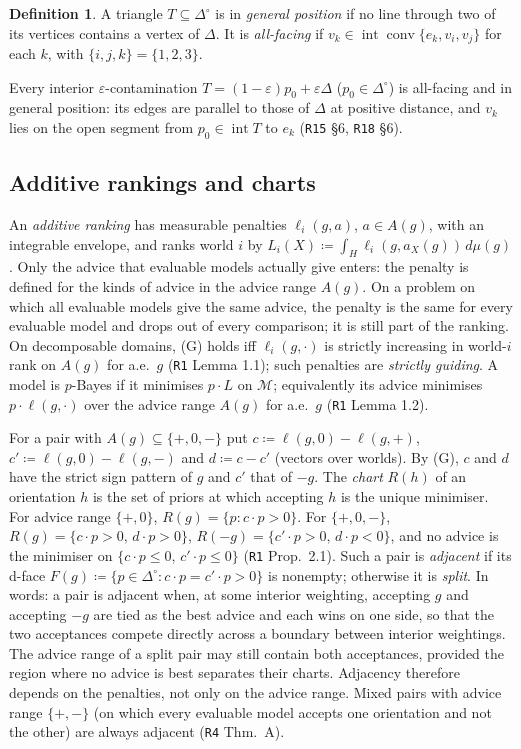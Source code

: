 \documentclass[11pt]{article}
\theoremstyle{definition}
\newtheorem{definition}[theorem]{Definition}
\theoremstyle{remark}
\newcommand{\Di}{\Delta^{\circ}}
\newcommand{\M}{\mathcal M}
\newcommand{\co}{\operatorname{conv}}
\newcommand{\src}[1]{\texttt{#1}}
\begin{document}
\begin{definition}\label{def:allfacing}
A triangle $T\subseteq\Di$ is in \emph{general position} if no line through two of its vertices contains a vertex of $\Delta$. It is \emph{all-facing} if $v_k\in\operatorname{int}\co\{e_k,v_i,v_j\}$ for each $k$, with $\{i,j,k\}=\{1,2,3\}$.
\end{definition}
Every interior $\varepsilon$-contamination $T=(1-\varepsilon)p_0+\varepsilon\Delta$ ($p_0\in\Di$) is all-facing and in general position: its edges are parallel to those of $\Delta$ at positive distance, and $v_k$ lies on the open segment from $p_0\in\operatorname{int}T$ to $e_k$ (\src{R15} \S6, \src{R18} \S6).

\subsection{Additive rankings and charts}
An \emph{additive ranking} has measurable penalties $\ell_i(g,a)$, $a\in A(g)$, with an integrable envelope, and ranks world $i$ by $L_i(X)\coloneqq\int_H\ell_i(g,a_X(g))\,d\mu(g)$. Only the advice that evaluable models actually give enters: the penalty is defined for the kinds of advice in the advice range $A(g)$. On a problem on which all evaluable models give the same advice, the penalty is the same for every evaluable model and drops out of every comparison; it is still part of the ranking. On decomposable domains, (G) holds iff $\ell_i(g,\cdot)$ is strictly increasing in world-$i$ rank on $A(g)$ for a.e.\ $g$ (\src{R1} Lemma 1.1); such penalties are \emph{strictly guiding}. A model is $p$-Bayes if it minimises $p\cdot L$ on $\M$; equivalently its advice minimises $p\cdot\ell(g,\cdot)$ over the advice range $A(g)$ for a.e.\ $g$ (\src{R1} Lemma 1.2).

For a pair with $A(g)\subseteq\{+,0,-\}$ put $c\coloneqq\ell(g,0)-\ell(g,+)$, $c'\coloneqq\ell(g,0)-\ell(g,-)$ and $d\coloneqq c-c'$ (vectors over worlds). By (G), $c$ and $d$ have the strict sign pattern of $g$ and $c'$ that of $-g$. The \emph{chart} $R(h)$ of an orientation $h$ is the set of priors at which accepting $h$ is the unique minimiser. For advice range $\{+,0\}$, $R(g)=\{p:c\cdot p>0\}$. For $\{+,0,-\}$, $R(g)=\{c\cdot p>0,\,d\cdot p>0\}$, $R(-g)=\{c'\cdot p>0,\,d\cdot p<0\}$, and no advice is the minimiser on $\{c\cdot p\le0,\,c'\cdot p\le0\}$ (\src{R1} Prop.~2.1). Such a pair is \emph{adjacent} if its d-face $F(g)\coloneqq\{p\in\Di:c\cdot p=c'\cdot p>0\}$ is nonempty; otherwise it is \emph{split}. In words: a pair is adjacent when, at some interior weighting, accepting $g$ and accepting $-g$ are tied as the best advice and each wins on one side, so that the two acceptances compete directly across a boundary between interior weightings. The advice range of a split pair may still contain both acceptances, provided the region where no advice is best separates their charts. Adjacency therefore depends on the penalties, not only on the advice range. Mixed pairs with advice range $\{+,-\}$ (on which every evaluable model accepts one orientation and not the other) are always adjacent (\src{R4} Thm.~A).
\end{document}
